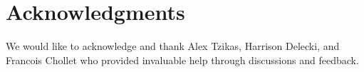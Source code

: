 \section*{Acknowledgments}

We would like to acknowledge and thank Alex Tzikas, Harrison Delecki, and Francois Chollet who provided invaluable help through discussions and feedback.